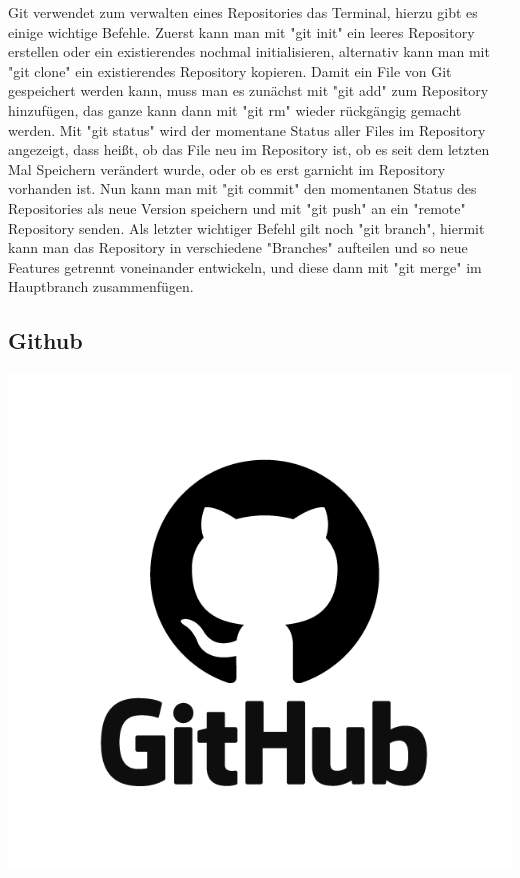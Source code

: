 Git verwendet zum verwalten eines Repositories das Terminal, hierzu gibt es einige wichtige Befehle. Zuerst kann man mit "git init" ein leeres Repository erstellen 
oder ein existierendes nochmal initialisieren, alternativ kann man mit "git clone" ein existierendes Repository kopieren. Damit ein File von Git gespeichert werden
kann, muss man es zunächst mit "git add" zum Repository hinzufügen, das ganze kann dann mit "git rm" wieder rückgängig gemacht werden. Mit "git status" wird der 
momentane Status aller Files im Repository angezeigt, dass heißt, ob das File neu im Repository ist, ob es seit dem letzten Mal Speichern verändert wurde, oder ob es 
erst garnicht im Repository vorhanden ist. Nun kann man mit "git commit" den momentanen Status des Repositories als neue Version speichern und mit "git push" an ein "remote" 
Repository senden. Als letzter wichtiger Befehl gilt noch "git branch", hiermit kann man das Repository in verschiedene "Branches" aufteilen und so 
neue Features getrennt voneinander entwickeln, und diese dann mit "git merge" im Hauptbranch zusammenfügen.
\cite{sysarch-git-2}

\subsection{Github}
\includegraphics[scale=0.05]{pics/github.png}

